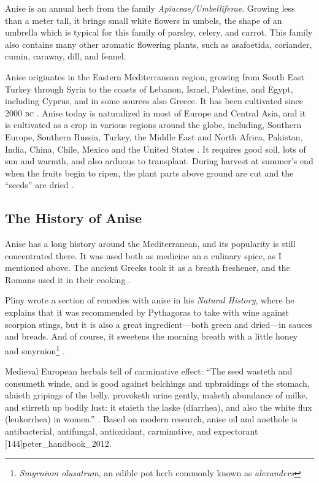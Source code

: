 Anise is an annual herb from the family \textit{Apiaceae/Umbelliferae}. Growing less than a meter tall, it brings small white flowers in umbels, the shape of an umbrella which is typical for this family of parsley, celery, and carrot. This family also contains many other aromatic flowering plants, such as asa\-foetida, coriander, cumin, caraway, dill, and fennel.

Anise originates in the Eastern Mediterranean region, growing from South East Turkey through Syria to the coasts of Lebanon, Israel, Palestine, and Egypt, including Cyprus, and in some sources also Greece. It has been cultivated since 2000 \textsc{bc} \autocite[718]{mabberley_mabberleys_2017}.
Anise today is naturalized in most of Europe and Central Asia, and it is cultivated as a crop in various regions around the globe, including, Southern Europe, Southern Russia, Turkey, the Middle East and North Africa, Pakistan, India, China, Chile, Mexico and the United States \autocite[32]{farrell_spices_1985}. It requires good soil, lots of sun and warmth, and also arduous to transplant. During harvest at summer's end when the fruits begin to ripen, the plant parts above ground are cut and the ``seeds'' are dried \autocite[212]{van_wyk_culinary_2014}.

\subsection{The History of Anise}

Anise has a long history around the Mediterranean, and its popularity is still concentrated there. It was used both as medicine an a culinary spice, as I mentioned above. The ancient Greeks took it as a breath freshener, and the Romans used it in their cooking \autocite{farrell_spices_1985}.

Pliny wrote a section of remedies with anise in his \textit{Natural History}, where he explains that it was recommended by Pythagoras to take with wine against scorpion stings, but it is also a great ingredient---both green and dried---in sauces and breads. And of course, it sweetens the morning breath with a little honey and smyrnion\footnote{\textit{Smyrnium olusatrum}, an edible pot herb commonly known as \textit{alexanders}} \autocite[20:72 ]{pliny_the_elder_natural_1855}.

Medieval European herbals tell of carminative effect: ``The seed wasteth and consumeth winde, and is good against belchings and upbraidings of the stomach, alaieth gripings of the belly, provoketh urine gently, maketh abundance of milke, and stirreth up bodily lust: it staieth the laske (diarrhea), and also the white flux (leukorrhea) in women.'' \autocite[880 ]{gerarde_herball_1597}. Based on modern research, anise oil and anethole is antibacterial, antifungal, antioxidant, carminative, and expectorant [144]{peter_handbook_2012}.

